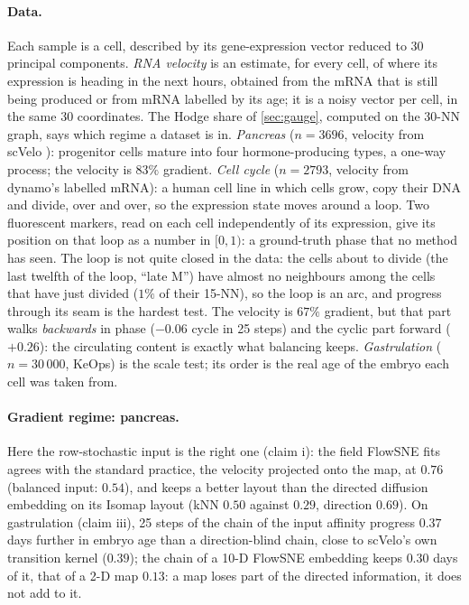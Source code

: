 \paragraph{Data.}
Each sample is a cell, described by its gene-expression vector reduced to
30 principal components. \emph{RNA velocity} is an estimate, for every
cell, of where its expression is heading in the next hours, obtained from
the mRNA that is still being produced \citep{lamanno2018rna} or from mRNA
labelled by its age; it is a noisy vector per cell, in the same 30
coordinates. The Hodge share of \cref{sec:gauge}, computed on the 30-NN
graph, says which regime a dataset is in.
\emph{Pancreas} \citep{bastidasponce2019comprehensive} ($n=3696$,
velocity from scVelo \citep{bergen2020generalizing}): progenitor cells
mature into four hormone-producing types, a one-way process; the velocity
is $83\%$ gradient. \emph{Cell cycle} \citep{battich2020sequencing}
($n=2793$, velocity from dynamo's labelled mRNA): a human cell line in
which cells grow, copy their DNA and divide, over and over, so the
expression state moves around a loop. Two fluorescent markers, read on
each cell independently of its expression, give its position on that
loop as a number in $[0,1)$: a ground-truth phase that no method has
seen. The loop is not quite closed in the data: the cells about to divide
(the last twelfth of the loop, ``late M'') have almost no neighbours among
the cells that have just divided ($1\%$ of their 15-NN), so the loop is an
arc, and progress through its seam is the hardest test. The velocity is
$67\%$ gradient, but that part walks \emph{backwards} in phase ($-0.06$
cycle in 25 steps) and the cyclic part forward ($+0.26$): the circulating
content is exactly what balancing keeps. \emph{Gastrulation}
\citep{pijuansala2019single} ($n=30\,000$, KeOps) is the scale test; its
order is the real age of the embryo each cell was taken from.

\paragraph{Gradient regime: pancreas.}
Here the row-stochastic input is the right one (claim i): the field
FlowSNE fits agrees with the standard practice, the velocity projected
onto the map, at $0.76$ (balanced input: $0.54$), and keeps a better
layout than the directed diffusion embedding on its Isomap layout (kNN
$0.50$ against $0.29$, direction $0.69$). On gastrulation (claim iii), 25 steps of the
chain of the input affinity progress $0.37$ days further in embryo age than
a direction-blind chain, close to scVelo's own transition kernel ($0.39$);
the chain of a 10-D FlowSNE embedding keeps $0.30$ days of it, that of a
2-D map $0.13$: a map loses part of the directed information, it does not
add to it.

